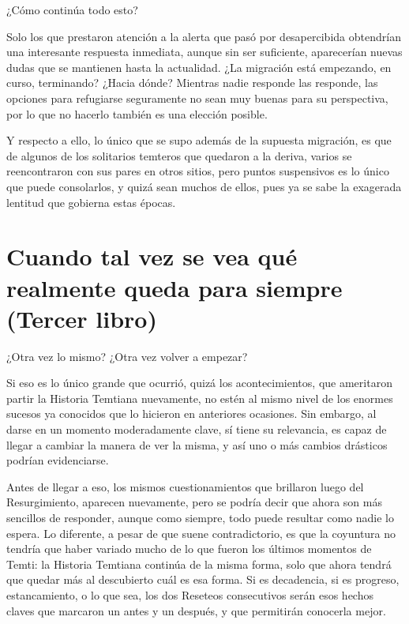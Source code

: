 \documentclass[
]{book}
\begin{document}
¿Cómo continúa todo esto?

Solo los que prestaron atención a la alerta que pasó por desapercibida obtendrían una interesante respuesta inmediata, aunque sin ser suficiente, aparecerían nuevas dudas que se mantienen hasta la actualidad. ¿La migración está empezando, en curso, terminando? ¿Hacia dónde? Mientras nadie responde las responde, las opciones para refugiarse seguramente no sean muy buenas para su perspectiva, por lo que no hacerlo también es una elección posible.

Y respecto a ello, lo único que se supo además de la supuesta migración, es que de algunos de los solitarios temteros que quedaron a la deriva, varios se reencontraron con sus pares en otros sitios, pero puntos suspensivos es lo único que puede consolarlos, y quizá sean muchos de ellos, pues ya se sabe la exagerada lentitud que gobierna estas épocas.

\hypertarget{cuando-tal-vez-se-vea-quuxe9-realmente-queda-para-siempre-tercer-libro}{%
\chapter{Cuando tal vez se vea qué realmente queda para siempre (Tercer libro)}\label{cuando-tal-vez-se-vea-quuxe9-realmente-queda-para-siempre-tercer-libro}}

¿Otra vez lo mismo? ¿Otra vez volver a empezar?

Si eso es lo único grande que ocurrió, quizá los acontecimientos, que ameritaron partir la Historia Temtiana nuevamente, no estén al mismo nivel de los enormes sucesos ya conocidos que lo hicieron en anteriores ocasiones. Sin embargo, al darse en un momento moderadamente clave, sí tiene su relevancia, es capaz de llegar a cambiar la manera de ver la misma, y así uno o más cambios drásticos podrían evidenciarse.

Antes de llegar a eso, los mismos cuestionamientos que brillaron luego del Resurgimiento, aparecen nuevamente, pero se podría decir que ahora son más sencillos de responder, aunque como siempre, todo puede resultar como nadie lo espera. Lo diferente, a pesar de que suene contradictorio, es que la coyuntura no tendría que haber variado mucho de lo que fueron los últimos momentos de Temti: la Historia Temtiana continúa de la misma forma, solo que ahora tendrá que quedar más al descubierto cuál es esa forma. Si es decadencia, si es progreso, estancamiento, o lo que sea, los dos Reseteos consecutivos serán esos hechos claves que marcaron un antes y un después, y que permitirán conocerla mejor.
\end{document}
